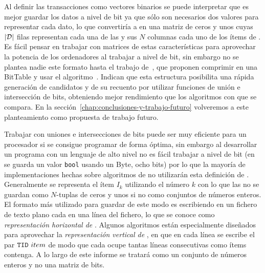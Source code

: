 Al definir las transacciones como vectores binarios se puede interpretar que es mejor guardar los datos a nivel de bit ya que sólo son necesarios dos valores para representar cada dato, lo que convertiría a \D en una matriz de ceros y unos cuyas $|\D|$ filas representan cada una de las \transacciones y sus $N$ columnas cada uno de los ítems de \I. Es fácil pensar en trabajar con matrices de estas características para aprovechar la potencia de los ordenadores al trabajar a nivel de bit, sin embargo no se plantea nadie este formato hasta el trabajo de~\citet{DongHan-BitTableFIEfficientFIMalg-2007}, que proponen comprimir \D en una {BitTable} y usar el algoritmo~. Indican que esta estructura posibilita una rápida generación de candidatos y de su recuento por utilizar funciones de unión e intersección de bits, obteniendo mejor rendimiento que los algoritmos con que se compara. En la sección~\ref{chap:conclusiones-y-trabajo-futuro} volveremos a este planteamiento como propuesta de trabajo futuro.

Trabajar con uniones e intersecciones de bits puede ser muy eficiente para un procesador si se consigue programar de forma óptima, sin embargo al desarrollar un programa con un lenguaje de alto nivel no es fácil trabajar a nivel de bit (en \langCpp se guarda un valor \texttt{bool} usando un Byte, ocho bits) por lo que la mayoría de implementaciones hechas sobre algoritmos de \arm no utilizarán esta definición de \I. Generalmente se representa el ítem $I_k$ utilizando el número $k$ con lo que las \transacciones no se guardan como $N$-tuplas de ceros y unos si no como conjuntos de números enteros. El formato más utilizado para guardar \D de este modo es escribiendo en un fichero de texto plano cada \transaccion en una línea del fichero, lo que se conoce como \emph{representación horizontal de \D}. Algunos algoritmos están especialmente diseñados para aprovechar la \emph{representación vertical de \D}, en que en cada línea se escribe el par $\TID\ item$ de modo que cada \transaccion ocupe tantas líneas consecutivas como ítems contenga. A lo largo de este informe se tratará \D como un conjunto de números enteros y no una matriz de bits.
